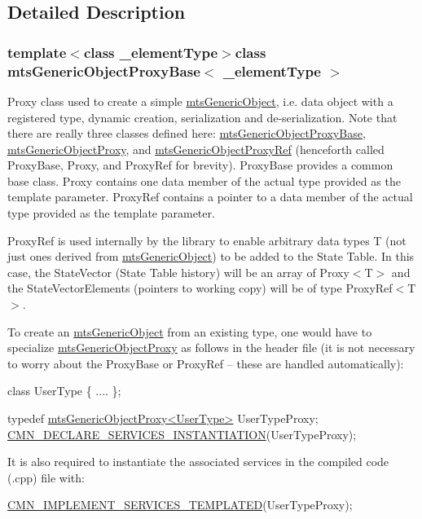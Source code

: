 \subsection{Detailed Description}
\subsubsection*{template$<$class \+\_\+element\+Type$>$class mts\+Generic\+Object\+Proxy\+Base$<$ \+\_\+element\+Type $>$}

Proxy class used to create a simple \hyperlink{classmts_generic_object}{mts\+Generic\+Object}, i.\+e. data object with a registered type, dynamic creation, serialization and de-\/serialization. Note that there are really three classes defined here\+: \hyperlink{classmts_generic_object_proxy_base}{mts\+Generic\+Object\+Proxy\+Base}, \hyperlink{classmts_generic_object_proxy}{mts\+Generic\+Object\+Proxy}, and \hyperlink{classmts_generic_object_proxy_ref}{mts\+Generic\+Object\+Proxy\+Ref} (henceforth called Proxy\+Base, Proxy, and Proxy\+Ref for brevity). Proxy\+Base provides a common base class. Proxy contains one data member of the actual type provided as the template parameter. Proxy\+Ref contains a pointer to a data member of the actual type provided as the template parameter.

Proxy\+Ref is used internally by the library to enable arbitrary data types T (not just ones derived from \hyperlink{classmts_generic_object}{mts\+Generic\+Object}) to be added to the State Table. In this case, the State\+Vector (State Table history) will be an array of Proxy$<$\+T$>$ and the State\+Vector\+Elements (pointers to working copy) will be of type Proxy\+Ref$<$\+T$>$.

To create an \hyperlink{classmts_generic_object}{mts\+Generic\+Object} from an existing type, one would have to specialize \hyperlink{classmts_generic_object_proxy}{mts\+Generic\+Object\+Proxy} as follows in the header file (it is not necessary to worry about the Proxy\+Base or Proxy\+Ref -- these are handled automatically)\+: 
\begin{DoxyCode}
\textcolor{keyword}{class }UserType \{
    ....
\};

\textcolor{keyword}{typedef} \hyperlink{classmts_generic_object_proxy}{mtsGenericObjectProxy<UserType>} UserTypeProxy;
\hyperlink{cmn_class_register_macros_8h_a198d81818e0b66ebe53e692dc7c5d058}{CMN\_DECLARE\_SERVICES\_INSTANTIATION}(UserTypeProxy);
\end{DoxyCode}


It is also required to instantiate the associated services in the compiled code (.cpp) file with\+: 
\begin{DoxyCode}
\hyperlink{cmn_class_register_macros_8h_a6d3e8cb412f66ff7e73f3ab52290f471}{CMN\_IMPLEMENT\_SERVICES\_TEMPLATED}(UserTypeProxy);
\end{DoxyCode}


